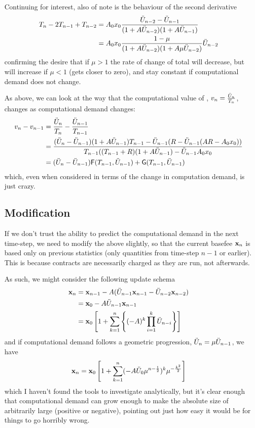 \documentclass[11pt,a4paper]{article}
\begin{document}
Continuing for interest, also of note is the behaviour of the second derivative
\begin{align}
T_n - 2T_{n-1} + T_{n-2} &= A_0 x_0 \frac{\ddot{U}_{n-2} - \ddot{U}_{n-1}}{(1 + A\ddot{U}_{n-2})(1 + A\ddot{U}_{n-1})}\\
&= A_0 x_0 \frac{1 - \mu}{(1 + A\ddot{U}_{n-2})(1 + A\mu\ddot{U}_{n-2})}\ddot{U}_{n-2}
\end{align}
confirming the desire that if $\mu > 1$ the rate of change of total \ether will decrease, but will increase if $\mu < 1$ (\ie gets closer to zero), and stay constant if computational demand does not change.

As above, we can look at the way that the computational value of \ether, $v_n = \frac{\ddot{U}_n}{T_n}$, changes as computational demand changes:
\begin{align}
v_n - v_{n-1} &= \frac{\ddot{U}_n}{T_n} - \frac{\ddot{U}_{n-1}}{T_{n-1}}\\
&= \frac{(\ddot{U}_n - \ddot{U}_{n-1})(1 + A\ddot{U}_{n-1})T_{n-1} - \ddot{U}_{n-1}(R - \ddot{U}_{n-1}(AR - A_0x_0))}{T_{n-1}((T_{n-1} + R)(1 + A\ddot{U}_{n-1}) - \ddot{U}_{n-1}A_0 x_0}\\
&= (\ddot{U}_n - \ddot{U}_{n-1}) {\textsf F}(T_{n-1}, \ddot{U}_{n-1}) + {\textsf G}(T_{n-1}, \ddot{U}_{n-1})
\end{align}
which, even when considered in terms of the change in computation demand, is just crazy.

\subsection*{Modification}

If we don't trust the ability to predict the computational demand in the next time-step, we need to modify the above slightly, so that the current basefee $\mathbf x_n$ is based only on previous statistics (\ie only quantities from time-step $n-1$ or earlier). This is because contracts are necessarily charged as they are run, not afterwards.

As such, we might consider the following update schema
\begin{align}
\mathbf x_n &= \mathbf x_{n-1} - A ( \ddot{U}_{n-1} \mathbf x_{n-1} -  \ddot{U}_{n-2} \mathbf x_{n-2} )\\
&= \mathbf x_0 - A\ddot{U}_{n-1}\mathbf x_{n-1}\\
&= \mathbf x_0 \left[ 1 + \sum_{k=1}^{n} \left\lbrace (-A)^k \prod_{i=1}^k \ddot{U}_{n-i} \right\rbrace \right]
\end{align}
and if computational demand follows a geometric progression, $\ddot{U}_n = \mu\ddot{U}_{n-1}$, we have
\begin{equation}
\mathbf x_n = \mathbf x_0 \left[ 1 + \sum_{k=1}^n (-A\ddot{U}_0\mu^{n - \frac{1}{2}})^k\mu^{-\frac{k^2}{2}} \right]
\end{equation}
which I haven't found the tools to investigate analytically, but it's clear enough that computational demand can grow enough to make the absolute size of \x arbitrarily large (positive or negative), pointing out just how easy it would be for things to go horribly wrong.
\end{document}
